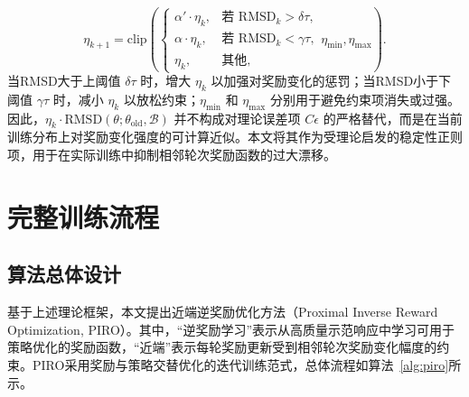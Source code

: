 \begin{equation}
    \eta_{k+1}
    =
    \mathrm{clip}\left(
    \begin{cases}
        \alpha' \cdot \eta_k, & \text{若 } \mathrm{RMSD}_k > \delta\tau, \\
        \alpha \cdot \eta_k, & \text{若 } \mathrm{RMSD}_k < \gamma\tau, \\
        \eta_k, & \text{其他},
    \end{cases}
    \eta_{\min},\eta_{\max}
    \right).
    \label{eq:adaptive_eta}
\end{equation}
当RMSD大于上阈值 $\delta\tau$ 时，增大 $\eta_k$ 以加强对奖励变化的惩罚；当RMSD小于下阈值 $\gamma\tau$ 时，减小 $\eta_k$ 以放松约束；$\eta_{\min}$ 和 $\eta_{\max}$ 分别用于避免约束项消失或过强。因此，$\eta_k\cdot\mathrm{RMSD}(\theta;\theta_{\mathrm{old}},\mathcal{B})$ 并不构成对理论误差项 $C\epsilon$ 的严格替代，而是在当前训练分布上对奖励变化强度的可计算近似。本文将其作为受理论启发的稳定性正则项，用于在实际训练中抑制相邻轮次奖励函数的过大漂移。

\section{完整训练流程}

\subsection{算法总体设计}

基于上述理论框架，本文提出近端逆奖励优化方法（Proximal Inverse Reward Optimization, PIRO）。其中，“逆奖励学习”表示从高质量示范响应中学习可用于策略优化的奖励函数，“近端”表示每轮奖励更新受到相邻轮次奖励变化幅度的约束。PIRO采用奖励与策略交替优化的迭代训练范式，总体流程如算法~\ref{alg:piro}所示。

